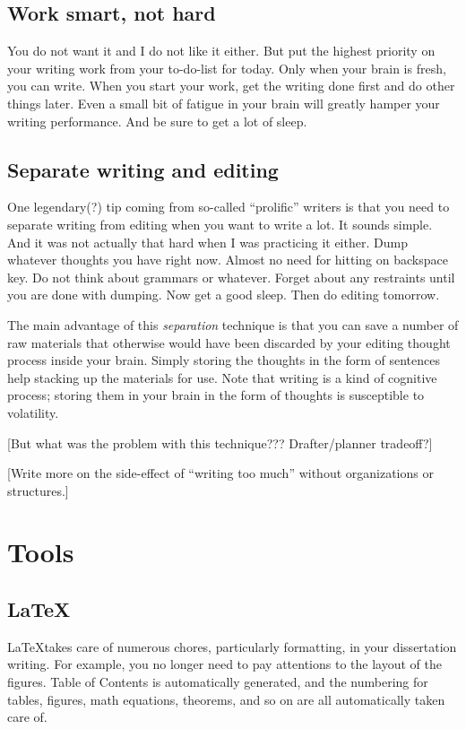 \documentclass[11pt]{article}
\begin{document}
\subsection{Work smart, not hard}

You do not want it and I do not like it either. But put the highest priority
on your writing work from your to-do-list for today. Only when your brain is
fresh, you can write. When you start your work, get the writing done first and
do other things later. Even a small bit of fatigue in your brain will
greatly hamper your writing performance. And be sure to get a lot of sleep. 

\subsection{Separate writing and editing}

One legendary(?) tip coming from so-called ``prolific'' writers is that you
need to separate writing from editing when you want to write a lot. It sounds
simple. And it was not actually that hard when I was practicing it either.
Dump whatever thoughts you have right now.  Almost no need for hitting on
backspace key. Do not think about grammars or whatever. Forget about any
restraints until you are done with dumping. Now get a good sleep. Then do editing
tomorrow.

The main advantage of this \emph{separation} technique is that you can save a
number of raw materials that otherwise would have been discarded by your
editing thought process inside your brain. Simply storing the thoughts in the
form of sentences help stacking up the materials for use. Note that writing is
a kind of cognitive process; storing them in your brain in the form of
thoughts is susceptible to volatility.

[But what was the problem with this technique??? Drafter/planner tradeoff?]

[Write more on the side-effect of ``writing too much'' without organizations
or structures.]

\section{Tools}

\subsection{\LaTeX}

\LaTeX takes care of numerous chores, particularly formatting, in your
dissertation writing.  For example, you no longer need to pay attentions to
the layout of the figures.  Table of Contents is automatically generated, and
the numbering for tables, figures, math equations, theorems, and so on are all
automatically taken care of.
\end{document}
